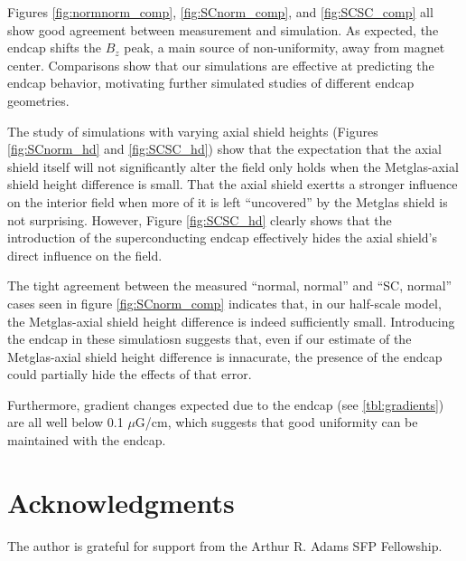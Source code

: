 \documentclass[twocolumn,aps,prb,citeautoscript]{revtex4-1}
\begin{document}
Figures \ref{fig:normnorm_comp}, \ref{fig:SCnorm_comp}, and \ref{fig:SCSC_comp} all show good agreement between
measurement
and simulation. As expected, the endcap shifts the $B_z$ peak, a main source of non-uniformity, away
from magnet center. Comparisons show that our simulations are effective at predicting the endcap behavior, motivating
further simulated studies of different endcap geometries.

The study of simulations with varying axial shield heights (Figures \ref{fig:SCnorm_hd} and \ref{fig:SCSC_hd})
show that the expectation that the axial shield itself will not significantly alter the field only holds when
the Metglas-axial shield height difference is small. That the axial shield exertts a stronger influence on the interior
field when more of it is left ``uncovered'' by the Metglas shield is not surprising. However, Figure \ref{fig:SCSC_hd}
clearly shows that the introduction of the superconducting endcap effectively hides the axial shield's direct
influence on the field.

The tight agreement between the measured ``normal, normal'' and ``SC, normal'' cases seen in figure
\ref{fig:SCnorm_comp} indicates that, in our half-scale model, the Metglas-axial shield height difference is
indeed sufficiently small. Introducing the endcap in these simulatiosn suggests that, even if our estimate of
the Metglas-axial shield height difference is innacurate, the presence of the endcap could partially hide the effects
of that error.

Furthermore, gradient changes expected due to the endcap (see \ref{tbl:gradients}) are all well below 0.1 $\mu$G/cm,
which suggests that
good uniformity can be maintained with the endcap.

\section{Acknowledgments}

The author is grateful for support from the Arthur R. Adams SFP Fellowship.
\end{document}
